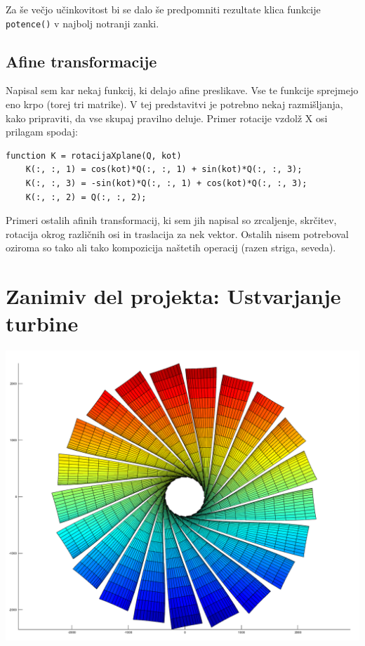 \documentclass[a4paper,11pt]{article}
\begin{document}
Za še večjo učinkovitost bi se dalo še predpomniti rezultate klica funkcije \texttt{potence()} v najbolj notranji zanki.
	
	\subsection{Afine transformacije}
	
	Napisal sem kar nekaj funkcij, ki delajo afine preslikave. Vse te funkcije sprejmejo eno krpo (torej tri matrike). V tej predstavitvi je potrebno nekaj razmišljanja, kako pripraviti, da vse skupaj pravilno deluje. Primer rotacije vzdolž X osi prilagam spodaj:
	
	\begin{verbatim}
function K = rotacijaXplane(Q, kot)
	K(:, :, 1) = cos(kot)*Q(:, :, 1) + sin(kot)*Q(:, :, 3);
	K(:, :, 3) = -sin(kot)*Q(:, :, 1) + cos(kot)*Q(:, :, 3);
	K(:, :, 2) = Q(:, :, 2);
	\end{verbatim}
	
	Primeri ostalih afinih transformacij, ki sem jih napisal so zrcaljenje, skrčitev, rotacija okrog različnih osi in traslacija za nek vektor. Ostalih nisem potreboval oziroma so tako ali tako kompozicija naštetih operacij (razen striga, seveda).
	
	
	\section{Zanimiv del projekta: Ustvarjanje turbine}
	
	\includegraphics[scale=0.35]{krilca v turbini}
	
\end{document}
